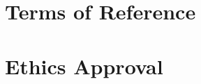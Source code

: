 \documentclass[11pt, twoside, a4paper]{report}
\begin{document}
\section{Terms of Reference}


\section{Ethics Approval}
\label{sec:ethics_approval}




\todos

\end{document}
